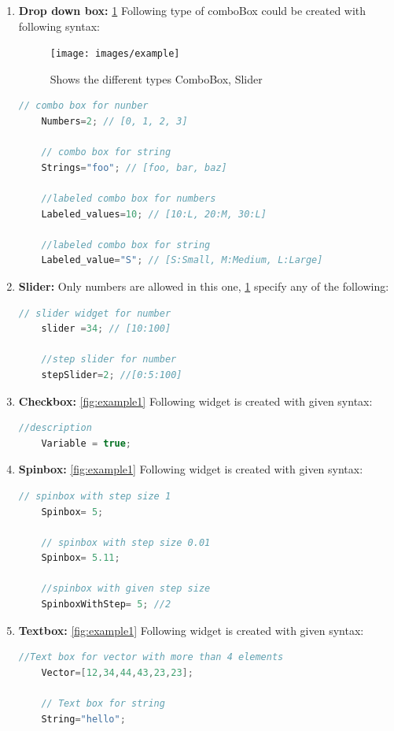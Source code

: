 \documentclass[12pt,includeheadfoot,a4paper]{report}
\begin{document}
\begin{enumerate}
	\item \textbf{Drop down box:} \ref{fig:example} Following type of comboBox could be created with following syntax:
	\begin{figure}
		\centering
		\texttt{[image: images/example]}
		\caption{Shows the different types ComboBox, Slider}
		\label{fig:example}
	\end{figure}
	
	\begin{lstlisting}[language=c++]
	// combo box for nunber
	Numbers=2; // [0, 1, 2, 3]
	
	// combo box for string
	Strings="foo"; // [foo, bar, baz]
	
	//labeled combo box for numbers
	Labeled_values=10; // [10:L, 20:M, 30:L]
	
	//labeled combo box for string
	Labeled_value="S"; // [S:Small, M:Medium, L:Large]
	\end{lstlisting}
	\item \textbf{Slider:} Only numbers are allowed in this one, \ref{fig:example} specify any of the following:
	\begin{lstlisting}[language=c++]
	// slider widget for number
	slider =34; // [10:100]
	
	//step slider for number
	stepSlider=2; //[0:5:100]
	\end{lstlisting}
	\item \textbf{Checkbox:} \ref{fig:example1} Following widget is created with given syntax:
	\begin{lstlisting}[language=c++]
	//description
	Variable = true;
	\end{lstlisting}
	\item \textbf{Spinbox:} \ref{fig:example1} Following widget is created with given syntax:
	\begin{lstlisting}[language=c++]
	// spinbox with step size 1
	Spinbox= 5;
	
	// spinbox with step size 0.01
	Spinbox= 5.11;
	
	//spinbox with given step size
	SpinboxWithStep= 5; //2
	\end{lstlisting}
	\item \textbf{Textbox:} \ref{fig:example1} Following widget is created with given syntax:
	\begin{lstlisting}[language=c++]
	//Text box for vector with more than 4 elements
	Vector=[12,34,44,43,23,23];
	
	// Text box for string
	String="hello";
	

\end{lstlisting}
\end{enumerate}
\end{document}
